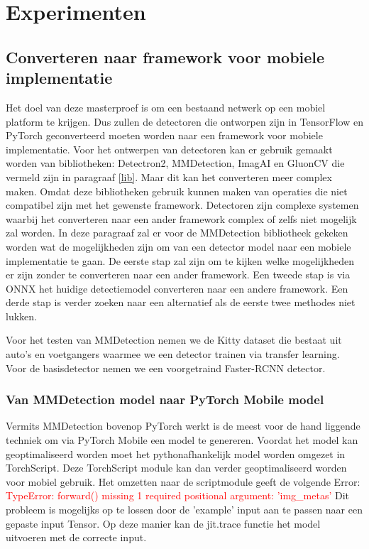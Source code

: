 \chapter{Experimenten}
\section{Converteren naar framework voor mobiele implementatie}
Het doel van deze masterproef is om een bestaand netwerk op een mobiel platform te krijgen.
Dus zullen de detectoren die ontworpen zijn in TensorFlow en PyTorch geconverteerd moeten worden naar een framework voor mobiele implementatie.
Voor het ontwerpen van detectoren kan er gebruik gemaakt worden van bibliotheken: Detectron2, MMDetection, ImagAI en GluonCV die vermeld zijn in paragraaf \ref{lib}.
Maar dit kan het converteren meer complex maken.
Omdat deze bibliotheken gebruik kunnen maken van operaties die niet compatibel zijn met het gewenste framework.
Detectoren zijn complexe systemen waarbij het converteren naar een ander framework complex of zelfs niet mogelijk zal worden.
In deze paragraaf zal er voor de MMDetection bibliotheek gekeken worden wat de mogelijkheden zijn om van een detector model naar een mobiele implementatie te gaan.
De eerste stap zal zijn om te kijken welke mogelijkheden er zijn zonder te converteren naar een ander framework.
Een tweede stap is via ONNX het huidige detectiemodel converteren naar een andere framework.
Een derde stap is verder zoeken naar een alternatief als de eerste twee methodes niet lukken.

Voor het testen van MMDetection nemen we de Kitty dataset \cite{Geiger_IJRR_2013} die bestaat uit auto's en voetgangers waarmee we een detector trainen via transfer learning.
Voor de basisdetector nemen we een voorgetraind Faster-RCNN detector.

\subsection{Van MMDetection model naar PyTorch Mobile model} \label{pmob}
Vermits MMDetection bovenop PyTorch werkt is de meest voor de hand liggende techniek om via PyTorch Mobile een model te genereren.
Voordat het model kan geoptimaliseerd worden moet het pythonafhankelijk model worden omgezet in TorchScript. 
Deze TorchScript module kan dan verder geoptimaliseerd worden voor mobiel gebruik.
Het omzetten naar de scriptmodule geeft de volgende Error: \newline
\textcolor{red}{TypeError: forward() missing 1 required positional argument: 'img\_metas'} \newline
Dit probleem is mogelijks op te lossen door de 'example' input aan te passen naar een gepaste input Tensor.
Op deze manier kan de jit.trace functie het model uitvoeren met de correcte input.


